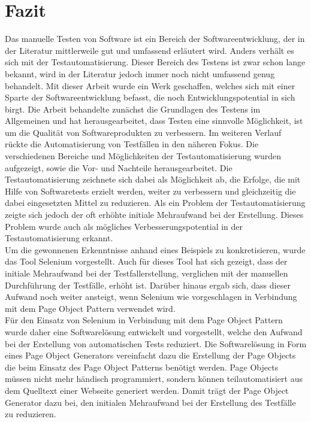 \chapter{Fazit}
\label{sec:fazit}
Das manuelle Testen von Software ist ein Bereich der Softwareentwicklung, der in der Literatur mittlerweile gut und umfassend erläutert wird. Anders verhält es sich mit der Testautomatisierung. Dieser Bereich des Testens ist zwar schon lange bekannt, wird in der Literatur jedoch immer noch nicht umfassend genug behandelt. Mit dieser Arbeit wurde ein Werk geschaffen, welches sich mit einer Sparte der Softwareentwicklung befasst, die noch Entwicklungspotential in sich birgt. 
Die Arbeit behandelte zunächst die Grundlagen des Testens im Allgemeinen und hat herausgearbeitet, dass Testen eine sinnvolle Möglichkeit, ist um die Qualität von Softwareprodukten zu verbessern. 
Im weiteren Verlauf rückte die Automatisierung von Testfällen in den näheren Fokus. Die verschiedenen Bereiche und Möglichkeiten der Testautomatisierung wurden aufgezeigt, sowie die Vor- und Nachteile herausgearbeitet.
Die Testautomatisierung zeichnete sich dabei als Möglichkeit ab, die Erfolge, die mit Hilfe von Softwaretests erzielt werden, weiter zu verbessern und gleichzeitig die dabei eingesetzten Mittel zu reduzieren. Als ein Problem der Testautomatisierung zeigte sich jedoch der oft erhöhte initiale Mehraufwand bei der Erstellung. Dieses Problem wurde auch als mögliches Verbesserungspotential in der Testautomatisierung erkannt.\\
Um die gewonnenen Erkenntnisse anhand eines Beispiels zu konkretisieren, wurde das Tool Selenium vorgestellt.
Auch für dieses Tool hat sich gezeigt, dass der initiale Mehraufwand bei der Testfallerstellung, verglichen mit der manuellen Durchführung der Testfälle, erhöht ist. Darüber hinaus ergab sich, dass dieser Aufwand noch weiter ansteigt, wenn Selenium wie vorgeschlagen in Verbindung mit dem Page Object Pattern verwendet wird.\\
Für den Einsatz von Selenium in Verbindung mit dem Page Object Pattern wurde daher eine Softwarelösung entwickelt und vorgestellt, welche den Aufwand bei der Erstellung von automatischen Tests reduziert.
Die Softwarelösung in Form eines Page Object Generators vereinfacht dazu die Erstellung der Page Objects die beim Einsatz des Page Object Patterns benötigt werden. Page Objects müssen nicht mehr händisch programmiert, sondern können teilautomatisiert aus dem Quelltext einer Webseite generiert werden. Damit trägt der Page Object Generator dazu bei, den initialen Mehraufwand bei der Erstellung des Testfälle zu reduzieren.

